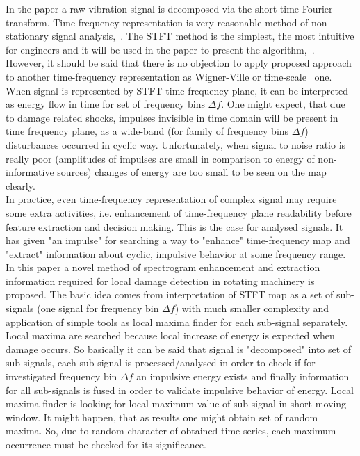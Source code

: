 \documentclass[3p,times]{elsarticle}
\begin{document}
In the paper a raw vibration signal is decomposed via the short-time Fourier transform. Time-frequency representation is very reasonable method of non-stationary signal analysis,~\cite{bib14,bib15,bib16,bib8,bib9,bib10,bib11,bib12,bib13,HeManifold}. The STFT method is the simplest, the most intuitive for engineers and it will be used in the paper to present the algorithm,~\cite{bib8}. However, it should be said that there is no objection to apply proposed approach to another time-frequency representation as Wigner-Ville or time-scale~\cite{WangScale} one.\\
When signal is represented by STFT time-frequency plane, it can be interpreted as energy flow in time for set of frequency bins $\Delta f$. One might expect, that due to damage related shocks, impulses invisible in time domain will be present in time frequency plane, as a wide-band (for family of frequency bins $\Delta f$) disturbances occurred in cyclic way. Unfortunately, when signal to noise ratio is really poor (amplitudes of impulses are small in comparison to energy of non-informative sources) changes of energy are too small to be seen on the map clearly.\\
In practice, even time-frequency representation of complex signal may require some extra activities, i.e. enhancement of time-frequency plane readability before feature extraction and decision making. This is the case for analysed signals. It has given "an impulse" for searching a way to "enhance" time-frequency map and "extract" information about cyclic, impulsive behavior at some frequency range.\\
In this paper a novel method of spectrogram enhancement and extraction information required for local damage detection in rotating machinery is proposed. The basic idea comes from interpretation of STFT map as a set of sub-signals (one signal for frequency bin $\Delta f$) with much smaller complexity and application of simple tools as local maxima finder for each sub-signal separately. Local maxima are searched because local increase of energy is expected when damage occurs. So basically it can be said that signal is "decomposed" into set of sub-signals, each sub-signal is processed/analysed in order to check if for investigated frequency bin $\Delta f$ an impulsive energy exists and finally information for all sub-signals is fused in order to validate impulsive behavior of energy. Local maxima finder is looking for local maximum value of sub-signal in short moving window. It might happen, that as results one might obtain set of random maxima. So, due to random character of obtained time series, each maximum occurrence must be checked for its significance. \\
\end{document}
